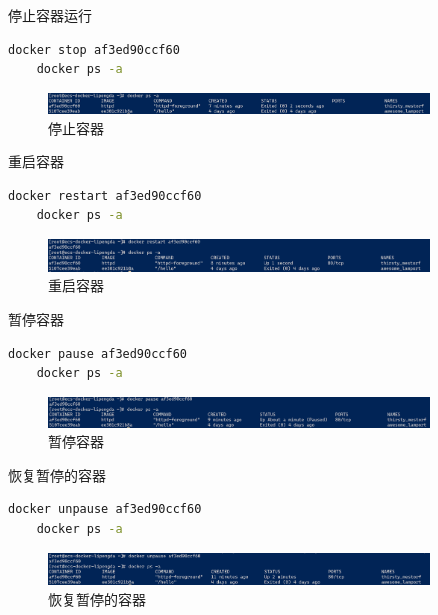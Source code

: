 \documentclass{article}
\begin{document}
停止容器运行

\begin{lstlisting}[language=bash]
    docker stop af3ed90ccf60
    docker ps -a
\end{lstlisting}

\begin{figure}[H]
\centering
\includegraphics[width=0.9\textwidth]{img/0.2.4.1.4.png}
\caption{停止容器}
\end{figure}

重启容器

\begin{lstlisting}[language=bash]
    docker restart af3ed90ccf60
    docker ps -a
\end{lstlisting}

\begin{figure}[H]
\centering
\includegraphics[width=0.9\textwidth]{img/0.2.4.1.5.png}
\caption{重启容器}
\end{figure}

暂停容器

\begin{lstlisting}[language=bash]
    docker pause af3ed90ccf60
    docker ps -a
\end{lstlisting}

\begin{figure}[H]
\centering
\includegraphics[width=0.9\textwidth]{img/0.2.4.1.6.png}
\caption{暂停容器}
\end{figure}

恢复暂停的容器

\begin{lstlisting}[language=bash]
    docker unpause af3ed90ccf60
    docker ps -a
\end{lstlisting}

\begin{figure}[H]
\centering
\includegraphics[width=0.9\textwidth]{img/0.2.4.1.7.png}
\caption{恢复暂停的容器}
\end{figure}
\end{document}
